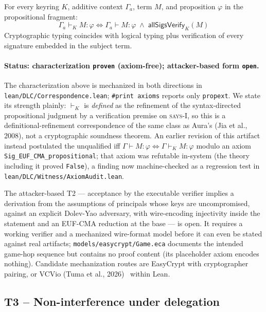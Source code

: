 \begin{theorem}
For every keyring $K$, additive context $\Gamma_a$, term $M$, and
proposition $\varphi$ in the propositional fragment:
\[
\Gamma_a \vdash_K M : \varphi
\iff
\Gamma_a \vdash M : \varphi \;\wedge\; \mathsf{allSigsVerify}_K(M)
\]
Cryptographic typing coincides with logical typing plus verification
of every signature embedded in the subject term.
\end{theorem}

\paragraph{Status: characterization \texttt{proven} (axiom-free);
attacker-based form \texttt{open}.}
The characterization above is mechanized in both directions in
\texttt{lean/DLC/Correspondence.lean}; \texttt{\#print axioms} reports
only \texttt{propext}.  We state its strength plainly: $\vdash_K$ is
\emph{defined} as the refinement of the syntax-directed propositional
judgment by a verification premise on \textsc{says-I}, so this is a
definitional-refinement correspondence of the same class as Aura's
(Jia et al., 2008), not a cryptographic soundness theorem.  An earlier
revision of this artifact instead postulated the unqualified iff
$\Gamma \vdash M : \varphi \iff \Gamma \vdash_K M : \varphi$ modulo an
axiom \texttt{Sig\_EUF\_CMA\_propositional}; that axiom was refutable
in-system (the theory including it proved \texttt{False}), a finding
now machine-checked as a regression test in
\texttt{lean/DLC/Witness/AxiomAudit.lean}.

The attacker-based T2 --- acceptance by the executable verifier
implies a derivation from the assumptions of principals whose keys are
uncompromised, against an explicit Dolev-Yao adversary, with
wire-encoding injectivity inside the statement and an EUF-CMA
reduction at the base --- is open.  It requires a working verifier and
a mechanized wire-format model before it can even be stated against
real artifacts; \texttt{models/easycrypt/Game.eca} documents the
intended game-hop sequence but contains no proof content (its
placeholder axiom encodes nothing).  Candidate mechanization routes
are EasyCrypt with cryptographer pairing, or VCVio (Tuma et al.,
2026)~\cite{tuma2026vcvio} within Lean.

\subsection{T3 -- Non-interference under delegation}

